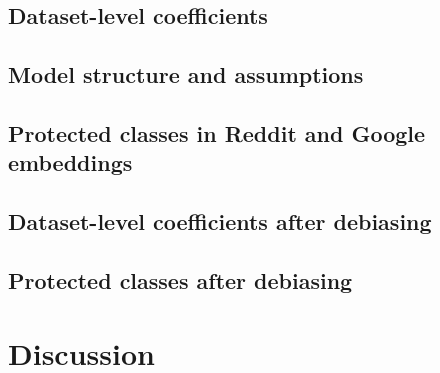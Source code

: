 \documentclass[
  12pt,
]{book}
\begin{document}
\hypertarget{dataset-level-coefficients}{%
\section{Dataset-level coefficients}\label{dataset-level-coefficients}}

\hypertarget{model-structure-and-assumptions}{%
\section{Model structure and assumptions}\label{model-structure-and-assumptions}}

\hypertarget{protected-classes-in-reddit-and-google-embeddings}{%
\section{Protected classes in Reddit and Google embeddings}\label{protected-classes-in-reddit-and-google-embeddings}}

\hypertarget{dataset-level-coefficients-after-debiasing}{%
\section{Dataset-level coefficients after debiasing}\label{dataset-level-coefficients-after-debiasing}}

\hypertarget{protected-classes-after-debiasing}{%
\section{Protected classes after debiasing}\label{protected-classes-after-debiasing}}

\hypertarget{discussion}{%
\chapter{Discussion}\label{discussion}}
\end{document}
